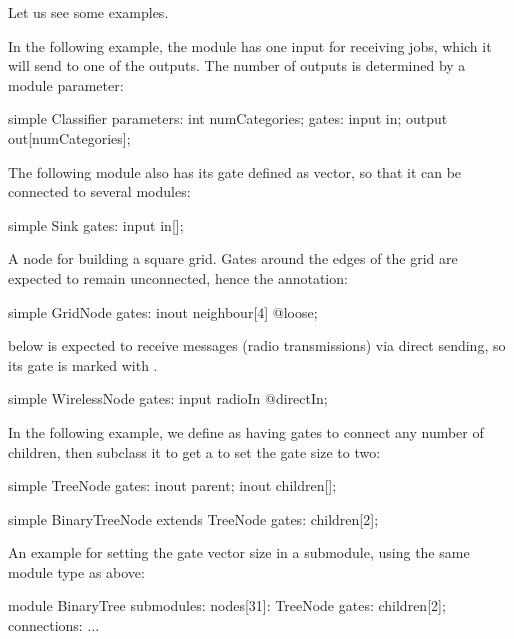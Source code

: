 Let us see some examples.

In the following example, the  module has one input for
receiving jobs, which it will send to one of the outputs. The number of
outputs is determined by a module parameter:

\begin{ned}
simple Classifier {
    parameters:
        int numCategories;
    gates:
        input in;
        output out[numCategories];
}
\end{ned}

The following  module also has its  gate defined
as vector, so that it can be connected to several modules:

\begin{ned}
simple Sink {
    gates:
        input in[];
}
\end{ned}

A node for building a square grid. Gates around the edges of the grid are
expected to remain unconnected, hence the  annotation:

\begin{ned}
simple GridNode {
    gates:
        inout neighbour[4] @loose;
}
\end{ned}

 below is expected to receive messages (radio transmissions)
via direct sending, so its  gate is marked with .

\begin{ned}
simple WirelessNode {
    gates:
        input radioIn @directIn;
}
\end{ned}

In the following example, we define  as having gates to connect
any number of children, then subclass it to get a  to
set the gate size to two:

\begin{ned}
simple TreeNode {
    gates:
        inout parent;
        inout children[];
}

simple BinaryTreeNode extends TreeNode {
    gates:
        children[2];
}
\end{ned}

An example for setting the gate vector size in a submodule, using the same
 module type as above:

\begin{ned}
module BinaryTree {
    submodules:
        nodes[31]: TreeNode {
            gates:
                children[2];
        }
    connections:
        ...
}
\end{ned}



